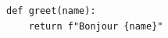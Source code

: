 \documentclass{article}
\begin{document}
\begin{verbatim}
def greet(name):
    return f"Bonjour {name}"
\end{verbatim}
\end{document}
